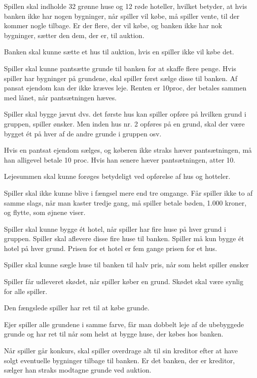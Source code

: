 \documentclass[class=article, crop=false]{standalone}
\newcommand{\reqstart}{
\begin{list}{\thereqcount}{\usecounter{reqcount}}
\setcounter{reqcount}{\value{reqcountbackup}}
}
\newcommand{\reqend}{
\setcounter{reqcountbackup}{\value{reqcount}}
\end{list}
}
\begin{document}
\reqstart
\item Spillen skal indholde 32 grønne huse og 12 røde hoteller, hvilket betyder, at hvis banken ikke har nogen bygninger, når spiller vil købe, må spiller vente, til der kommer nogle tilbage. Er der flere, der vil købe, og banken ikke har nok bygninger, sætter den dem, der er, til auktion.
\item Banken skal kunne sætte et hus til auktion, hvis en spiller ikke vil købe det.
\item Spiller skal kunne pantsætte grunde til banken for at skaffe flere penge. Hvis spiller har bygninger på grundene, skal spiller først sælge disse til banken. Af pansat ejendom kan der ikke kræves leje. Renten er 10proc, der betales sammen med lånet, når pantsætningen hæves.
\item Spiller skal bygge jævnt dvs. det første hus kan spiller opføre på hvilken grund i gruppen, spiller ønsker. Men inden hus nr. 2 opføres på en grund, skal der være bygget ét på hver af de andre grunde i gruppen osv.
\item Hvis en pantsat ejendom sælges, og køberen ikke straks hæver pantsætningen, må
han alligevel betale 10 proc. Hvis han senere hæver pantsætningen, atter 10.
\item Lejesummen skal kunne forøges betydeligt ved opførelse af hus og hotteler.
\item Spiller skal ikke kunne blive i fængsel mere end tre omgange. Får spiller ikke to af samme slags, når man kaster tredje gang, må spiller betale bøden, 1.000 kroner, og flytte, som øjnene viser.
\item Spiller skal kunne bygge ét hotel, når spiller har fire huse på hver grund i gruppen. Spiller skal aflevere disse fire huse til banken. Spiller må kun bygge ét hotel på hver grund. Prisen for et hotel er fem gange prisen for et hus.
\item Spiller skal kunne sægle huse til banken til halv pris, når som helst spiller ønsker
\item Spiller får udleveret skødet, når spiller køber en grund. Skødet skal være synlig for alle spiller.
\item Den fængslede spiller har ret til at købe grunde.
\item Ejer spiller alle grundene i samme farve, får man dobbelt leje af de ubebyggede grunde og har ret til når som helst at bygge huse, der købes hos banken.
\item Når spiller går konkurs, skal spiller overdrage alt til sin kreditor efter at have solgt eventuelle bygninger tilbage til banken. Er det banken, der er kreditor, sælger han straks modtagne grunde ved auktion.
\reqend
\end{document}
